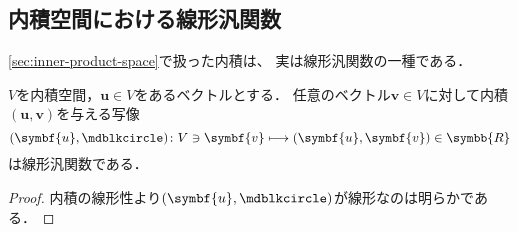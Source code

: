 \documentclass[../sotsu.tex]{subfiles}
\begin{document}
\subsection{内積空間における線形汎関数}

\cref{sec:inner-product-space}で扱った内積は、
実は線形汎関数の一種である．

\begin{proposition}
    $V$を内積空間，$\symbf{u} \in V$をあるベクトルとする．
    任意のベクトル$\symbf{v} \in V$に対して内積$(\symbf{u}, \symbf{v})$を与える写像
    \begin{equation}
        (\symbf{u}, \bigdot) \colon V \ni \symbf{v} \longmapsto (\symbf{u}, \symbf{v}) \in \symbb{R}
    \end{equation}
    は線形汎関数である．
\end{proposition}

\begin{proof}
    内積の線形性より$(\symbf{u}, \bigdot)$が線形なのは明らかである．
\end{proof}
\end{document}

